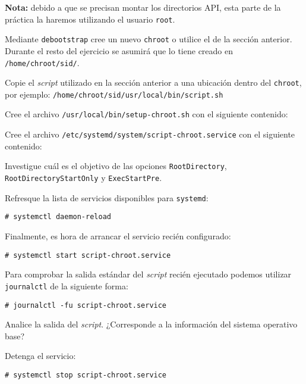 { \small \textbf{Nota:} debido a que se precisan montar los directorios API, esta
parte de la práctica la haremos utilizando el usuario \texttt{root}. }
\begin{questions}
  \question Mediante \texttt{debootstrap} cree un nuevo \texttt{chroot} o
  utilice el de la sección anterior. Durante el resto del ejercicio se
  asumirá que lo tiene creado en \texttt{/home/chroot/sid/}.

  \question Copie el \textit{script} utilizado en la sección anterior a una
  ubicación dentro del \texttt{chroot}, por ejemplo:
  \texttt{/home/chroot/sid/usr/local/bin/script.sh}

  \question Cree el archivo
  \texttt{/usr/local/bin/setup-chroot.sh} con el siguiente
  contenido:

  

  \question Cree el archivo
  \texttt{/etc/systemd/system/script-chroot.service} con el siguiente
  contenido:

  

  \question Investigue cuál es el objetivo de las opciones
  \texttt{RootDirectory}, \texttt{RootDirectoryStartOnly} y
  \texttt{ExecStartPre}.
  
  
  \question Refresque la lista de servicios disponibles para
  \texttt{systemd}:
  \begin{verbatim}
# systemctl daemon-reload
\end{verbatim}

    \question Finalmente, es hora de arrancar el servicio recién configurado:
\begin{verbatim}
# systemctl start script-chroot.service
\end{verbatim}

    \question Para comprobar la salida estándar del \textit{script} recién
    ejecutado podemos utilizar \texttt{journalctl} de la siguiente forma:
\begin{verbatim}
# journalctl -fu script-chroot.service
\end{verbatim}

    Analice la salida del \textit{script}. ¿Corresponde a la información
    del sistema operativo base?

    \question Detenga el servicio:
\begin{verbatim}
# systemctl stop script-chroot.service
\end{verbatim}


\end{questions}

